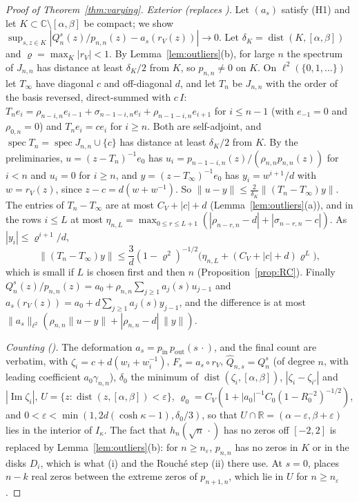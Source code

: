 \documentclass[11pt]{amsart}
\theoremstyle{definition}
\theoremstyle{remark}
\numberwithin{equation}{section}
\newcommand{\C}{\mathbb{C}}
\newcommand{\R}{\mathbb{R}}
\newcommand{\eps}{\varepsilon}
\DeclareMathOperator{\im}{Im}
\DeclareMathOperator{\dist}{dist}
\begin{document}
\begin{proof}[Proof of Theorem~\ref{thm:varying}]
\emph{Exterior (replaces \cite[Proposition~\ref{M-prop:exterior}]{Main}).} Let $(a_s)$ satisfy (H1) and let $K\subset\C\setminus[\alpha,\beta]$ be compact; we show $\sup_{s,z\in K}|Q_n^s(z)/p_{n,n}(z)-a_s(r_V(z))|\to0$. Let $\delta_K=\dist(K,[\alpha,\beta])$ and $\varrho=\max_K|r_V|<1$. By Lemma~\ref{lem:outliers}(b), for large $n$ the spectrum of $J_{n,n}$ has distance at least $\delta_K/2$ from $K$, so $p_{n,n}\ne0$ on $K$. On $\ell^2(\{0,1,\dots\})$ let $T_\infty$ have diagonal $c$ and off-diagonal $d$, and let $T_n$ be $J_{n,n}$ with the order of the basis reversed, direct-summed with $c\,I$: $T_ne_i=\rho_{n-i,n}e_{i-1}+\sigma_{n-1-i,n}e_i+\rho_{n-1-i,n}e_{i+1}$ for $i\le n-1$ (with $e_{-1}=0$ and $\rho_{0,n}=0$) and $T_ne_i=ce_i$ for $i\ge n$. Both are self-adjoint, and $\operatorname{spec}T_n=\operatorname{spec}J_{n,n}\cup\{c\}$ has distance at least $\delta_K/2$ from $K$. By the preliminaries, $u=(z-T_n)^{-1}e_0$ has $u_i=p_{n-1-i,n}(z)/(\rho_{n,n}p_{n,n}(z))$ for $i<n$ and $u_i=0$ for $i\ge n$, and $y=(z-T_\infty)^{-1}e_0$ has $y_i=w^{i+1}/d$ with $w=r_V(z)$, since $z-c=d(w+w^{-1})$. So $\|u-y\|\le\frac2{\delta_K}\|(T_n-T_\infty)y\|$. The entries of $T_n-T_\infty$ are at most $C_V+|c|+d$ (Lemma~\ref{lem:outliers}(a)), and in the rows $i\le L$ at most $\eta_{n,L}=\max_{0\le r\le L+1}(|\rho_{n-r,n}-d|+|\sigma_{n-r,n}-c|)$. As $|y_i|\le\varrho^{i+1}/d$,
\[
\|(T_n-T_\infty)y\|\le\frac3d(1-\varrho^2)^{-1/2}\bigl(\eta_{n,L}+(C_V+|c|+d)\varrho^{L}\bigr),
\]
which is small if $L$ is chosen first and then $n$ (Proposition~\ref{prop:RC}). Finally $Q_n^s(z)/p_{n,n}(z)=a_0+\rho_{n,n}\sum_{j\ge1}a_j(s)u_{j-1}$ and $a_s(r_V(z))=a_0+d\sum_{j\ge1}a_j(s)y_{j-1}$, and the difference is at most $\|a_s\|_{\ell^2}(\rho_{n,n}\|u-y\|+|\rho_{n,n}-d|\,\|y\|)$.

\emph{Counting (\cite[Section~\ref{M-sec:proof}]{Main}).} The deformation $a_s=p_{\mathrm{in}}\,p_{\mathrm{out}}(s\,\cdot)$, \cite[Hypothesis~\ref{M-hyp:H}]{Main} and the final count are verbatim, with $\zeta_i=c+d(w_i+w_i^{-1})$, $F_s=a_s\circ r_V$, $\widehat Q_{n,s}=Q_n^s$ (of degree $n$, with leading coefficient $a_0\gamma_{n,n}$), $\delta_0$ the minimum of $\dist(\zeta_i,[\alpha,\beta])$, $|\zeta_i-\zeta_{i'}|$ and $|\im\zeta_i|$, $U=\{z:\dist(z,[\alpha,\beta])<\eps\}$, $\varrho_0=C_V(1+|a_0|^{-1}C_0(1-R_0^{-2})^{-1/2})$, and $0<\eps<\min(1,2d(\cosh\kappa-1),\delta_0/3)$, so that $U\cap\R=(\alpha-\eps,\beta+\eps)$ lies in the interior of $I_\kappa$. The fact that $h_n(\sqrt n\,\cdot)$ has no zeros off $[-2,2]$ is replaced by Lemma~\ref{lem:outliers}(b): for $n\ge n_\eps$, $p_{n,n}$ has no zeros in $K$ or in the disks $D_i$, which is what (i) and the Rouch\'e step (ii) there use. At $s=0$, \cite[Lemma~\ref{M-lem:quasi}]{Main} places $n-k$ real zeros between the extreme zeros of $p_{n+1,n}$, which lie in $U$ for $n\ge n_\eps$.
\end{proof}
\end{document}
